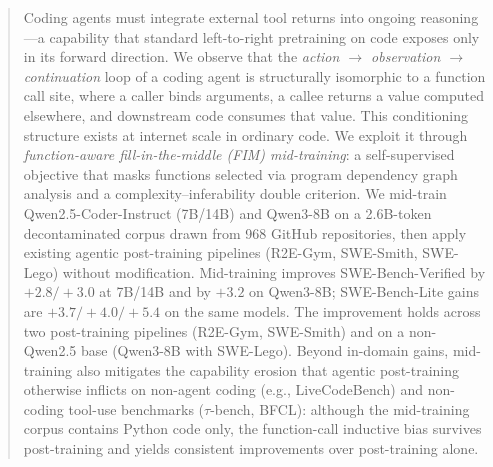 \vspace{-2.5ex}

\begin{abstract}
Coding agents must integrate external tool returns into ongoing reasoning---a
capability that standard left-to-right pretraining on code exposes only in its
forward direction. We observe that the
\textit{action $\rightarrow$ observation $\rightarrow$ continuation} loop of a
coding agent is structurally isomorphic to a function call site, where a
caller binds arguments, a callee returns a value computed elsewhere, and
downstream code consumes that value. This conditioning structure exists at
internet scale in ordinary code. We exploit it through
\emph{function-aware fill-in-the-middle (FIM) mid-training}: a self-supervised
objective that masks functions selected via program dependency graph
analysis and a complexity--inferability double criterion. We mid-train
Qwen2.5-Coder-Instruct (7B/14B) and Qwen3-8B on a 2.6B-token decontaminated
corpus drawn from 968 GitHub repositories, then apply existing agentic
post-training pipelines (R2E-Gym, SWE-Smith, SWE-Lego) without modification.
Mid-training improves SWE-Bench-Verified by $+2.8/+3.0$ at 7B/14B and by
$+3.2$ on Qwen3-8B; SWE-Bench-Lite gains are $+3.7/+4.0/+5.4$ on the same
models. The improvement holds across two post-training pipelines (R2E-Gym,
SWE-Smith) and on a non-Qwen2.5 base (Qwen3-8B with SWE-Lego). Beyond
in-domain gains, mid-training also mitigates the capability erosion that
agentic post-training otherwise inflicts on non-agent coding (e.g.,
LiveCodeBench) and non-coding tool-use benchmarks ($\tau$-bench, BFCL):
although the mid-training corpus contains Python code only, the
function-call inductive bias survives post-training and yields consistent
improvements over post-training alone.
\end{abstract}

\vspace{-1.5ex}